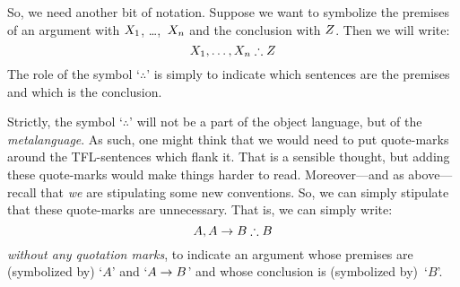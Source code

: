 

So, we need another bit of notation. Suppose we want to symbolize the premises of an argument with $X_1$, \dots,~$X_n$ and the conclusion with $Z$. Then we will write:
$$\metaX_1, \ldots, \metaX_n \therefore \metaZ$$
The role of the symbol `$\therefore$' is simply to indicate which sentences are the premises and which is the conclusion.


Strictly, the symbol `$\therefore$' will not be a part of the object language, but of the \emph{metalanguage}. As such, one might think that we would need to put quote-marks around the TFL-sentences which flank it. That is a sensible thought, but adding these quote-marks would make things harder to read. Moreover---and as above---recall that \emph{we} are stipulating some new conventions. So, we can simply stipulate that these quote-marks are unnecessary. That is, we can simply write:
$$A, A \eif B \therefore B$$
\emph{without any quotation marks}, to indicate an argument whose premises are (symbolized by) `$A$' and `$A \rightarrow B$' and whose conclusion is (symbolized by)~`$B$'.


